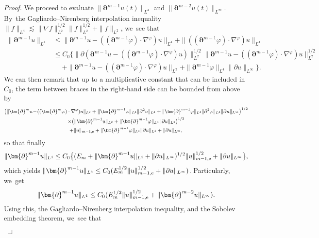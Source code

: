 \documentclass[10pt]{amsart}
\theoremstyle{definition}
\begin{document}
\begin{proof}
We proceed to evaluate $\|\bm{\partial}^{m-1}u(t)\|_{L^4}$ and $\|\bm{\partial}^{m-2}u(t)\|_{L^\infty}$. By~the Gagliardo--Nirenberg interpolation inequality $\|f\|_{L^4} \lesssim \|\nabla f\|_{L^2}^{1/2}\|f\|_{L^2}^{1/2} + \|f\|_{L^2}$, we~see that
\begin{align*}
\|\bm{\partial}^{m-1} u\|_{L^4}
&\leq \|\bm{\partial}^{m-1} u - ((\bm{\partial}^{m-1}\varphi)\cdot\nabla^\varphi)u\|_{L^4}
+ \|((\bm{\partial}^{m-1}\varphi)\cdot\nabla^\varphi)u\|_{L^4} \\
&\leq C_0 \bigl\{ \|\partial(\bm{\partial}^{m-1} u \! -\! ((\bm{\partial}^{m-1}\varphi)\cdot\nabla^\varphi)u)\|_{L^2}^{1/2}
\|\bm{\partial}^{m-1} u \!-\! ((\bm{\partial}^{m-1}\varphi)\cdot\nabla^\varphi)u\|_{L^2}^{1/2} \\
&\quad\;
+ \|\bm{\partial}^{m-1} u - ((\bm{\partial}^{m-1}\varphi)\cdot\nabla^\varphi)u\|_{L^2}
+ \|\bm{\partial}^{m-1}\varphi\|_{L^4} \|\partial u\|_{L^\infty} \bigr\} .
\end{align*}
We can then remark that up to a multiplicative constant that can be included in $C_0$, the term between braces in the right-hand side can be bounded from above by
\begin{multline*}
\bigl(\|\bm{\partial}^{m} u \!-\! ((\bm{\partial}^{m}\varphi)\cdot\nabla^\varphi)u\|_{L^2}
+ \|\bm{\partial}^{m-1}\varphi\|_{L^4} \|\partial^2u\|_{L^4}
+ \|\bm{\partial}^{m-1}\varphi\|_{L^4} \|\partial^2\varphi\|_{L^4} \|\partial u\|_{L^\infty} \bigr)^{1/2} \\
\times\bigl(\|\bm{\partial}^{m-1}u\|_{L^2} + \|\bm{\partial}^{m-1}\varphi\|_{L^4} \|\partial u\|_{L^4} \bigr)^{1/2} \\
+ \|u\|_{m-1,{\rm e}} + \|\bm{\partial}^{m-1}\varphi\|_{L^4} \|\partial u\|_{L^4} + \|\partial u\|_{L^\infty},
\end{multline*}
so that finally
\[
\|\bm{\partial}^{m-1} u\|_{L^4}
\leq C_0 \bigl\{ (E_m+\|\bm{\partial}^{m-1} u\|_{L^4}+\|\partial u\|_{L^\infty})^{1/2} \|u\|_{m-1,{\rm e}}^{1/2} + \|\partial u\|_{L^\infty} \bigr\},
\]
which yields $\|\bm{\partial}^{m-1} u\|_{L^4} \leq C_0 (E_m^{1/2}\|u\|_{m-1,{\rm e}}^{1/2} + \|\partial u\|_{L^\infty})$.
Particularly, we~get
\begin{equation}\label{CalIneq1}
\|\bm{\partial}^{m-1} u\|_{L^4} \leq C_0 (E_m^{1/2} \|u\|_{m-1,{\rm e}}^{1/2} + \|\bm{\partial}^{m-2} u\|_{L^\infty}).
\end{equation}
Using this, the Gagliardo--Nirenberg interpolation inequality, and the Sobolev embedding theorem, we~see that
\begin{align*}

\end{align*}
\end{proof}
\end{document}
